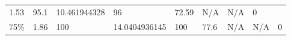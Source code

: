 \begin{longtable}[]{@{}lllllllll@{}}
\begin{minipage}[t]{0.08\columnwidth}
1.53\strut
\end{minipage} & \begin{minipage}[t]{0.09\columnwidth}\raggedright
95.1\strut
\end{minipage} & \begin{minipage}[t]{0.09\columnwidth}\raggedright
10.461944328\strut
\end{minipage} & \begin{minipage}[t]{0.08\columnwidth}\raggedright
96\strut
\end{minipage} & \begin{minipage}[t]{0.09\columnwidth}\raggedright
72.59\strut
\end{minipage} & \begin{minipage}[t]{0.09\columnwidth}\raggedright
N/A\strut
\end{minipage} & \begin{minipage}[t]{0.08\columnwidth}\raggedright
N/A\strut
\end{minipage} & \begin{minipage}[t]{0.11\columnwidth}\raggedright
0\strut
\end{minipage}\tabularnewline
\begin{minipage}[t]{0.05\columnwidth}\raggedright
75\%\strut
\end{minipage} & \begin{minipage}[t]{0.08\columnwidth}\raggedright
1.86\strut
\end{minipage} & \begin{minipage}[t]{0.09\columnwidth}\raggedright
100\strut
\end{minipage} & \begin{minipage}[t]{0.09\columnwidth}\raggedright
14.0404936145\strut
\end{minipage} & \begin{minipage}[t]{0.08\columnwidth}\raggedright
100\strut
\end{minipage} & \begin{minipage}[t]{0.09\columnwidth}\raggedright
77.6\strut
\end{minipage} & \begin{minipage}[t]{0.09\columnwidth}\raggedright
N/A\strut
\end{minipage} & \begin{minipage}[t]{0.08\columnwidth}\raggedright
N/A\strut
\end{minipage} & \begin{minipage}[t]{0.11\columnwidth}\raggedright
0\strut
\end{minipage}\tabularnewline

\end{longtable}
